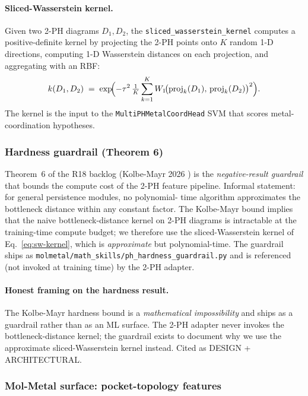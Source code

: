 \paragraph{Sliced-Wasserstein kernel.}
Given two 2-PH diagrams $D_1, D_2$, the
\texttt{sliced\_wasserstein\_kernel} computes a positive-definite
kernel by projecting the 2-PH points onto $K$ random 1-D directions,
computing 1-D Wasserstein distances on each projection, and
aggregating with an RBF:
\begin{equation}
  \label{eq:sw-kernel}
  k(D_1, D_2) \;=\; \exp\!\Bigl( - \tau^{2}\,
        \tfrac{1}{K} \sum_{k=1}^{K}
        W_{1}\!\bigl(\text{proj}_{k}(D_1),\,
                     \text{proj}_{k}(D_2)\bigr)^{2} \Bigr).
\end{equation}
The kernel is the input to the \texttt{MultiPHMetalCoordHead} SVM
that scores metal-coordination hypotheses.

\subsubsection{Hardness guardrail (Theorem 6)}
\label{sec:method:multi-ph-hardness}

Theorem~6 of the R18 backlog (Kolbe-Mayr 2026
\cite{ph_hardness_guardrail}) is the \emph{negative-result guardrail}
that bounds the compute cost of the 2-PH feature pipeline.
Informal statement: for general persistence modules, no polynomial-
time algorithm approximates the bottleneck distance within any
constant factor.  The Kolbe-Mayr bound implies that the naive
bottleneck-distance kernel on 2-PH diagrams is intractable at the
training-time compute budget; we therefore use the
sliced-Wasserstein kernel of Eq.~\eqref{eq:sw-kernel}, which is
\emph{approximate} but polynomial-time.  The guardrail ships as
\texttt{molmetal/math\_skills/ph\_hardness\_guardrail.py} and is
referenced (not invoked at training time) by the 2-PH adapter.

\paragraph{Honest framing on the hardness result.}
The Kolbe-Mayr hardness bound is a \emph{mathematical impossibility}
and ships as a guardrail rather than as an ML surface.  The 2-PH
adapter never invokes the bottleneck-distance kernel; the guardrail
exists to document why we use the approximate sliced-Wasserstein
kernel instead.  Cited as DESIGN + ARCHITECTURAL.

\subsubsection{Mol-Metal surface: pocket-topology features}
\label{sec:method:multi-ph-surface}

